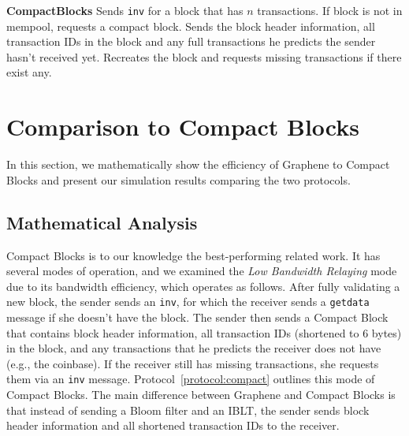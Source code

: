 {\begin{myprot}{\textbf{CompactBlocks}}
\label{protocol:compact}
\STATE \sender Sends {\tt inv} for a block that has $n$ transactions.
\STATE \recvr If block is not in mempool, requests a compact block.
\STATE \sender Sends the block header information, all transaction IDs in the block and any full transactions he predicts the sender hasn't received yet.
\STATE \recvr Recreates the block and requests missing transactions if there exist any.
\end{myprot}}

\section{Comparison to Compact Blocks} 
In this section, we mathematically show the efficiency of Graphene to Compact Blocks and present our simulation results comparing the two protocols.

\subsection{Mathematical Analysis}
Compact Blocks\cite{Corallo:2016} is to our knowledge the best-performing related work. It has several modes of operation, and 
we examined the \textit{Low Bandwidth
  Relaying} mode due to its bandwidth efficiency, which operates as follows. 
After fully
validating a new block, the sender sends an {\tt inv}, for which the receiver sends a {\tt getdata} message if she
doesn't have the block. The sender then sends a Compact Block
that contains block header information, all  transaction IDs (shortened to 6 bytes)
in the block, and any transactions that he predicts the receiver does
not have (e.g., the coinbase). If the receiver still has missing transactions, she requests
them via an {\tt inv} message. Protocol~\ref{protocol:compact} outlines
this  mode of Compact Blocks. The main difference between Graphene and Compact Blocks is that instead of
sending a Bloom filter and an IBLT, the sender sends block header
information and all shortened transaction IDs to the receiver. 

